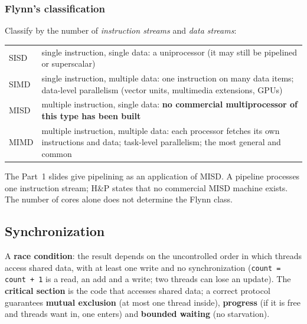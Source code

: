 \subsubsection{Flynn's classification}
Classify by the number of \emph{instruction streams} and \emph{data streams}:
\begin{center}
\small
\begin{tabular}{@{}lP{11cm}@{}}
\toprule
SISD & single instruction, single data: a uniprocessor (it may still be pipelined or
superscalar) \\
SIMD & single instruction, multiple data: one instruction on many data items; data-level
parallelism (vector units, multimedia extensions, GPUs) \\
MISD & multiple instruction, single data: \textbf{no commercial multiprocessor of
this type has been built} \\
MIMD & multiple instruction, multiple data: each processor fetches its own
instructions and data; task-level parallelism; the most general and common \\
\bottomrule
\end{tabular}
\end{center}
\begin{remark}
\slidefix{} The Part~1 slides give pipelining as an application of MISD. A
pipeline processes one instruction stream; H\&P states that no commercial MISD
machine exists. The number of cores alone does not determine the Flynn class.
\end{remark}

\subsection{Synchronization}
\label{sec:sync}

\begin{definition}
A \textbf{race condition}: the result depends on the uncontrolled order in which
threads access shared data, with at least one write and no synchronization
(\texttt{count = count + 1} is a read, an add and a write; two threads can lose an
update). The \textbf{critical section} is the code that accesses shared data; a
correct protocol guarantees \textbf{mutual exclusion} (at most one thread inside),
\textbf{progress} (if it is free and threads want in, one enters) and
\textbf{bounded waiting} (no starvation).
\end{definition}

